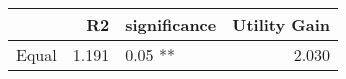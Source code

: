 \begin{tabular}{lrlr}
\toprule
{} &    R2 & significance &  Utility Gain \\
\midrule
Equal & 1.191 &      0.05 ** &         2.030 \\
\bottomrule
\end{tabular}
